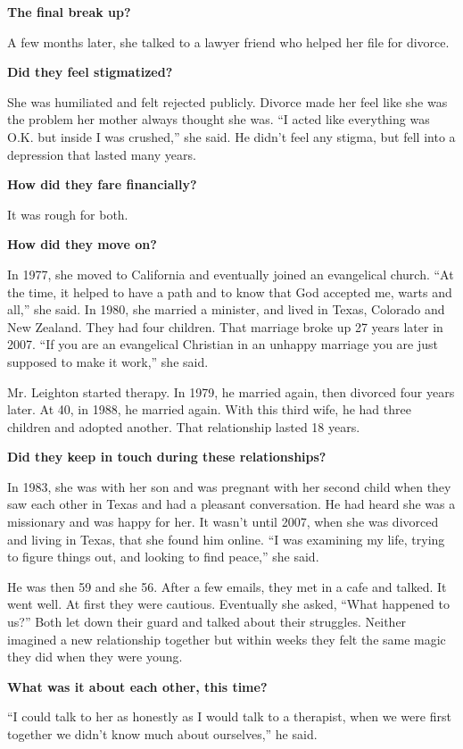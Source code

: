 \textbf{The final break up?}

A few months later, she talked to a lawyer friend who helped her file
for divorce.

\textbf{Did they feel stigmatized?}

She was humiliated and felt rejected publicly. Divorce made her feel
like she was the problem her mother always thought she was. ``I acted
like everything was O.K. but inside I was crushed,'' she said. He didn't
feel any stigma, but fell into a depression that lasted many years.

\textbf{How did they fare financially?}

It was rough for both.

\textbf{How did they move on?}

In 1977, she moved to California and eventually joined an evangelical
church. ``At the time, it helped to have a path and to know that God
accepted me, warts and all,'' she said. In 1980, she married a minister,
and lived in Texas, Colorado and New Zealand. They had four children.
That marriage broke up 27 years later in 2007. ``If you are an
evangelical Christian in an unhappy marriage you are just supposed to
make it work,'' she said.

Mr. Leighton started therapy. In 1979, he married again, then divorced
four years later. At 40, in 1988, he married again. With this third
wife, he had three children and adopted another. That relationship
lasted 18 years.

\textbf{Did they keep in touch during these relationships?}

In 1983, she was with her son and was pregnant with her second child
when they saw each other in Texas and had a pleasant conversation. He
had heard she was a missionary and was happy for her. It wasn't until
2007, when she was divorced and living in Texas, that she found him
online. ``I was examining my life, trying to figure things out, and
looking to find peace,'' she said.

He was then 59 and she 56. After a few emails, they met in a cafe and
talked. It went well. At first they were cautious. Eventually she asked,
``What happened to us?'' Both let down their guard and talked about
their struggles. Neither imagined a new relationship together but within
weeks they felt the same magic they did when they were young.

\textbf{What was it about each other, this time?}

``I could talk to her as honestly as I would talk to a therapist, when
we were first together we didn't know much about ourselves,'' he said.

